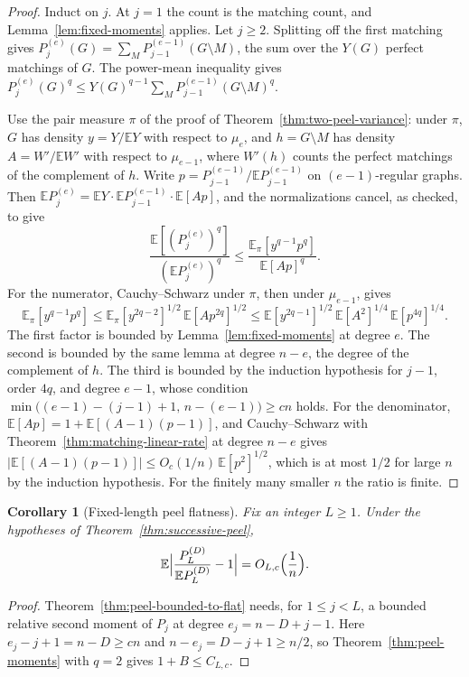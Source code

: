 \documentclass[11pt]{article}
\newtheorem{corollary}[theorem]{Corollary}
\newcommand{\EE}{\mathbb{E}}
\begin{document}
\begin{proof}
Induct on \(j\).
At \(j=1\) the count is the matching count, and Lemma~\ref{lem:fixed-moments}
applies.
Let \(j\ge2\). Splitting off the first matching gives
\(P_j^{(e)}(G)=\sum_M P_{j-1}^{(e-1)}(G\setminus M)\), the sum over the
\(Y(G)\) perfect matchings of \(G\).
The power-mean inequality gives
\(P_j^{(e)}(G)^q\le Y(G)^{q-1}\sum_M P_{j-1}^{(e-1)}(G\setminus M)^q\).

Use the pair measure \(\pi\) of the proof of
Theorem~\ref{thm:two-peel-variance}: under \(\pi\), \(G\) has density
\(y=Y/\EE Y\) with respect to \(\mu_e\), and \(h=G\setminus M\) has density
\(A=W'/\EE W'\) with respect to \(\mu_{e-1}\), where \(W'(h)\) counts the
perfect matchings of the complement of \(h\).
Write \(p=P_{j-1}^{(e-1)}/\EE P_{j-1}^{(e-1)}\) on \((e-1)\)-regular graphs.
Then
\(\EE P_j^{(e)}=\EE Y\cdot\EE P_{j-1}^{(e-1)}\cdot\EE[Ap]\), and the
normalizations cancel, as checked, to give
\[
\frac{\EE[(P_j^{(e)})^q]}{(\EE P_j^{(e)})^q}
\le
\frac{\EE_\pi[y^{q-1}p^q]}{\EE[Ap]^q}.
\]
For the numerator, Cauchy--Schwarz under \(\pi\), then under \(\mu_{e-1}\),
gives
\[
\EE_\pi[y^{q-1}p^q]
\le
\EE_\pi[y^{2q-2}]^{1/2}\,\EE[Ap^{2q}]^{1/2}
\le
\EE[y^{2q-1}]^{1/2}\,\EE[A^2]^{1/4}\,\EE[p^{4q}]^{1/4}.
\]
The first factor is bounded by Lemma~\ref{lem:fixed-moments} at degree \(e\).
The second is bounded by the same lemma at degree \(n-e\), the degree of the
complement of \(h\).
The third is bounded by the induction hypothesis for \(j-1\), order \(4q\),
and degree \(e-1\), whose condition
\(\min\bigl((e-1)-(j-1)+1,\,n-(e-1)\bigr)\ge cn\) holds.
For the denominator, \(\EE[Ap]=1+\EE[(A-1)(p-1)]\), and Cauchy--Schwarz with
Theorem~\ref{thm:matching-linear-rate} at degree \(n-e\) gives
\(|\EE[(A-1)(p-1)]|\le O_c(1/n)\,\EE[p^2]^{1/2}\), which is at most \(1/2\)
for large \(n\) by the induction hypothesis.
For the finitely many smaller \(n\) the ratio is finite.
\end{proof}

\begin{corollary}[Fixed-length peel flatness]
\label{cor:fixed-peel-flat}
Fix an integer \(L\ge1\).
Under the hypotheses of Theorem~\ref{thm:successive-peel},
\[
\EE\Bigl|\frac{P_L^{(D)}}{\EE P_L^{(D)}}-1\Bigr|=O_{L,c}\Bigl(\frac1n\Bigr).
\]
\end{corollary}

\begin{proof}
Theorem~\ref{thm:peel-bounded-to-flat} needs, for \(1\le j<L\), a bounded
relative second moment of \(P_j\) at degree \(e_j=n-D+j-1\).
Here \(e_j-j+1=n-D\ge cn\) and \(n-e_j=D-j+1\ge n/2\), so
Theorem~\ref{thm:peel-moments} with \(q=2\) gives \(1+B\le C_{L,c}\).
\end{proof}
\end{document}

